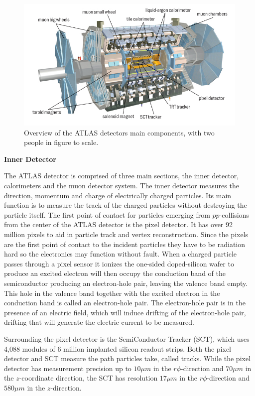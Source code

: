 \begin{figure}[h]
    \centering
    \vspace{20px}
    \includegraphics[width=.8\textwidth]{content/img/ATLAS_Detector.jpg}
    \caption{Overview of the ATLAS detectors main components, with two people in figure to scale.\cite{ATLAS_Illustration}}
    \vspace{20px}
    \label{fig:intro_ATLAS_detector}
\end{figure}

\noindent\textbf{Inner Detector}

The ATLAS detector is comprised of three main sections, the inner detector, calorimeters and the muon detector system. 
The inner detector measures the direction, momentum and charge of electrically charged particles.
Its main function is to measure the track of the charged particles without destroying the particle itself.
The first point of contact for particles emerging from $pp$-collisions from the center of the ATLAS detector is the pixel detector.\cite{PixelDetector_2008}
It has over 92 million pixels to aid in particle track and vertex reconstruction.
Since the pixels are the first point of contact to the incident particles they have to be radiation hard so the electronics may function without fault.
When a charged particle passes through a pixel sensor it ionizes the one-sided doped-silicon wafer to produce an excited electron will then occupy the conduction band of the semiconductor producing an electron-hole pair, leaving the valence band empty.\cite{KnollRadDetection}
This hole in the valence band together with the excited electron in the conduction band is called an electron-hole pair.
The electron-hole pair is in the presence of an electric field, which will induce drifting of the electron-hole pair, drifting that will generate the electric current to be measured.

Surrounding the pixel detector is the SemiConductor Tracker (SCT), which uses 4,088 modules of 6 million implanted silicon readout strips.\cite{ABDESSELAM2006642}
Both the pixel detector and SCT measure the path particles take, called tracks.
While the pixel detector has measurement precision up to $10 \mu m$ in the $r\phi$-direction and $70 \mu m$ in the $z$-coordinate direction,\cite{Andreazza:1287089} the SCT has resolution $17 \mu m$ in the $r\phi$-direction and $580 \mu m$ in the $z$-direction. 

